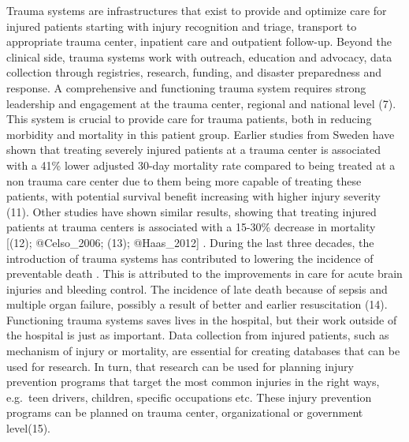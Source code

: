 \documentclass[
]{article}
\begin{document}
Trauma systems are infrastructures that exist to provide and optimize
care for injured patients starting with injury recognition and triage,
transport to appropriate trauma center, inpatient care and outpatient
follow-up. Beyond the clinical side, trauma systems work with outreach,
education and advocacy, data collection through registries, research,
funding, and disaster preparedness and response. A comprehensive and
functioning trauma system requires strong leadership and engagement at
the trauma center, regional and national level (7). This system is
crucial to provide care for trauma patients, both in reducing morbidity
and mortality in this patient group. Earlier studies from Sweden have
shown that treating severely injured patients at a trauma center is
associated with a 41\% lower adjusted 30-day mortality rate compared to
being treated at a non trauma care center due to them being more capable
of treating these patients, with potential survival benefit increasing
with higher injury severity (11). Other studies have shown similar
results, showing that treating injured patients at trauma centers is
associated with a 15-30\% decrease in mortality {[}(12); @Celso\_2006;
(13); @Haas\_2012{]} . During the last three decades, the introduction
of trauma systems has contributed to lowering the incidence of
preventable death . This is attributed to the improvements in care for
acute brain injuries and bleeding control. The incidence of late death
because of sepsis and multiple organ failure, possibly a result of
better and earlier resuscitation (14). Functioning trauma systems saves
lives in the hospital, but their work outside of the hospital is just as
important. Data collection from injured patients, such as mechanism of
injury or mortality, are essential for creating databases that can be
used for research. In turn, that research can be used for planning
injury prevention programs that target the most common injuries in the
right ways, e.g.~teen drivers, children, specific occupations etc. These
injury prevention programs can be planned on trauma center,
organizational or government level(15).
\end{document}
